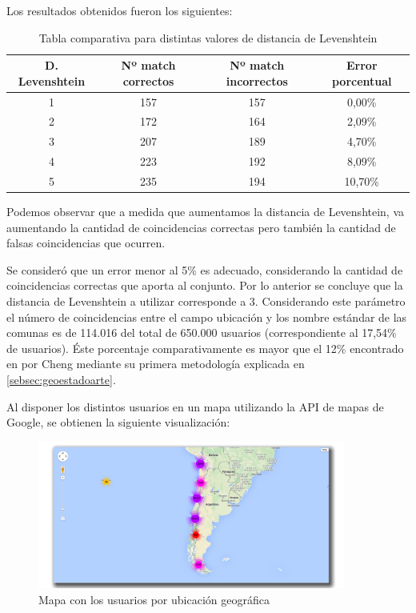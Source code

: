 Los resultados obtenidos fueron los siguientes:

\begin{table}[H]
	\centering
	\begin{tabular}{| c|c|c|c|}
		\hline
		D. Levenshtein & Nº match correctos & Nº match incorrectos  &  Error porcentual \\ \hline
		1   & 157 & 157 & 0,00\% \\ \hline
		2   & 172 & 164 & 2,09\% \\ \hline
		3	& 207 & 189 & 4,70\% \\ \hline
		4	& 223 & 192 & 8,09\% \\ \hline
		5	& 235 & 194 & 10,70\% \\ \hline
	\end{tabular}
	\caption {Tabla comparativa para distintas valores de distancia de Levenshtein}
\end{table}

Podemos observar que a medida que aumentamos la distancia de Levenshtein, va aumentando la cantidad de coincidencias correctas pero también la cantidad de falsas coincidencias que ocurren.

Se consideró que un error menor al 5\% es adecuado, considerando la cantidad de coincidencias correctas que aporta al conjunto. Por lo anterior se concluye que la distancia de Levenshtein a utilizar corresponde a 3. Considerando este parámetro el número de coincidencias entre el campo ubicación y los nombre estándar de las comunas es de 114.016 del total de 650.000 usuarios (correspondiente al 17,54\% de usuarios). Éste porcentaje comparativamente es mayor que el 12\% encontrado en \cite{Cheng:2010:YYT:1871437.1871535} por Cheng mediante su primera metodología explicada en  \ref{sebsec:geoestadoarte}.

Al disponer los distintos usuarios en un mapa utilizando la API de mapas de Google, se obtienen la siguiente visualización:

\begin{figure}[H]
	\centering
	\includegraphics[width=0.9\textwidth]{imgs/mapa_usuarios.png}
	\caption{Mapa con los usuarios por ubicación geográfica}
	\label{fig:mapa_usuarios}
\end{figure}